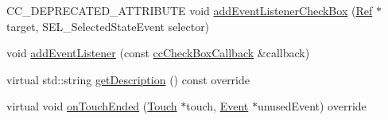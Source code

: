 \begin{DoxyCompactItemize}
\item 
C\+C\+\_\+\+D\+E\+P\+R\+E\+C\+A\+T\+E\+D\+\_\+\+A\+T\+T\+R\+I\+B\+U\+TE void \hyperlink{classui_1_1CheckBox_aba61dc37dea57e11abaf381d685cdb16}{add\+Event\+Listener\+Check\+Box} (\hyperlink{classRef}{Ref} $\ast$target, S\+E\+L\+\_\+\+Selected\+State\+Event selector)
\item 
void \hyperlink{classui_1_1CheckBox_a11c1b9cd5d7314a980f994977f960822}{add\+Event\+Listener} (const \hyperlink{classui_1_1CheckBox_ad210762967d1b444f5cf94f5e7450c56}{cc\+Check\+Box\+Callback} \&callback)
\item 
virtual std\+::string \hyperlink{classui_1_1CheckBox_a70adb285f026423e0b090ef5818b9988}{get\+Description} () const override
\item 
virtual void \hyperlink{classui_1_1CheckBox_a52c24b8aef0e2ea66f5220f49a95f510}{on\+Touch\+Ended} (\hyperlink{classTouch}{Touch} $\ast$touch, \hyperlink{classEvent}{Event} $\ast$unused\+Event) override
\end{DoxyCompactItemize}
